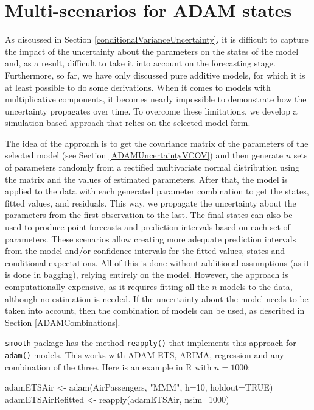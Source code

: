 \documentclass[
]{book}
\newenvironment{Shaded}{\begin{snugshade}}{\end{snugshade}}
\newcommand{\AttributeTok}[1]{\textcolor[rgb]{0.77,0.63,0.00}{#1}}
\newcommand{\ConstantTok}[1]{\textcolor[rgb]{0.00,0.00,0.00}{#1}}
\newcommand{\DecValTok}[1]{\textcolor[rgb]{0.00,0.00,0.81}{#1}}
\newcommand{\FunctionTok}[1]{\textcolor[rgb]{0.00,0.00,0.00}{#1}}
\newcommand{\NormalTok}[1]{#1}
\newcommand{\OtherTok}[1]{\textcolor[rgb]{0.56,0.35,0.01}{#1}}
\newcommand{\StringTok}[1]{\textcolor[rgb]{0.31,0.60,0.02}{#1}}
\theoremstyle{definition}
\theoremstyle{definition}
\theoremstyle{definition}
\theoremstyle{definition}
\theoremstyle{remark}
\begin{document}
\hypertarget{adamRefitted}{%
\section{Multi-scenarios for ADAM states}\label{adamRefitted}}

As discussed in Section \ref{conditionalVarianceUncertainty}, it is difficult to capture the impact of the uncertainty about the parameters on the states of the model and, as a result, difficult to take it into account on the forecasting stage. Furthermore, so far, we have only discussed pure additive models, for which it is at least possible to do some derivations. When it comes to models with multiplicative components, it becomes nearly impossible to demonstrate how the uncertainty propagates over time. To overcome these limitations, we develop a simulation-based approach that relies on the selected model form.

The idea of the approach is to get the covariance matrix of the parameters of the selected model (see Section \ref{ADAMUncertaintyVCOV}) and then generate \(n\) sets of parameters randomly from a rectified multivariate normal distribution using the matrix and the values of estimated parameters. After that, the model is applied to the data with each generated parameter combination to get the states, fitted values, and residuals. This way, we propagate the uncertainty about the parameters from the first observation to the last. The final states can also be used to produce point forecasts and prediction intervals based on each set of parameters. These scenarios allow creating more adequate prediction intervals from the model and/or confidence intervals for the fitted values, states and conditional expectations. All of this is done without additional assumptions (as it is done in bagging), relying entirely on the model. However, the approach is computationally expensive, as it requires fitting all the \(n\) models to the data, although no estimation is needed. If the uncertainty about the model needs to be taken into account, then the combination of models can be used, as described in Section \ref{ADAMCombinations}.

\texttt{smooth} package has the method \texttt{reapply()} that implements this approach for \texttt{adam()} models. This works with ADAM ETS, ARIMA, regression and any combination of the three. Here is an example in R with \(n=1000\):

\begin{Shaded}
\begin{Highlighting}[]
\NormalTok{adamETSAir }\OtherTok{\textless{}{-}} \FunctionTok{adam}\NormalTok{(AirPassengers, }\StringTok{"MMM"}\NormalTok{, }\AttributeTok{h=}\DecValTok{10}\NormalTok{, }\AttributeTok{holdout=}\ConstantTok{TRUE}\NormalTok{)}
\NormalTok{adamETSAirRefitted }\OtherTok{\textless{}{-}} \FunctionTok{reapply}\NormalTok{(adamETSAir, }\AttributeTok{nsim=}\DecValTok{1000}\NormalTok{)}
\end{Highlighting}
\end{Shaded}
\end{document}
